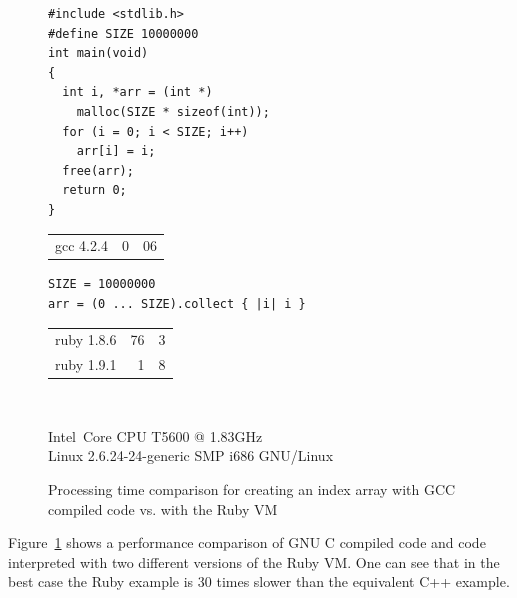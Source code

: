 \documentclass[12pt,a4paper,oneside,openright]{book}
\newcommand{\fig}[1]{Figure~\ref{fig:#1}}
\begin{document}
\begin{CJK}{UTF8}{}
\begin{figure}[htbp]
  \begin{center}
    \lstset{language=C,frame=single,numbers=none}
    \begin{minipage}[c]{.45\textwidth}
      \begin{center}
        \begin{lstlisting}
#include <stdlib.h>
#define SIZE 10000000
int main(void)
{
  int i, *arr = (int *)
    malloc(SIZE * sizeof(int));
  for (i = 0; i < SIZE; i++)
    arr[i] = i;
  free(arr);
  return 0;
}
        \end{lstlisting}
        \begin{bf}
          \begin{tabular}{lr@{.}l@{s}}
            gcc 4.2.4 & 0 & 06
          \end{tabular}
        \end{bf}
      \end{center}
    \end{minipage}\hspace{1ex}
    \lstset{language=Ruby,frame=single,numbers=none}
    \begin{minipage}[c]{.5\textwidth}
      \begin{center}
        \begin{lstlisting}
SIZE = 10000000
arr = (0 ... SIZE).collect { |i| i }
        \end{lstlisting}
        \begin{bf}
          \begin{tabular}{lr@{.}l@{s}}
            ruby 1.8.6 & 76 & 3\\
            ruby 1.9.1 &  1 & 8
          \end{tabular}
        \end{bf}
      \end{center}
    \end{minipage}\medskip\\
    \begin{small}
      Intel\textregistered\ Core \acs{CPU} T5600 @ 1.83GHz\\
      Linux 2.6.24-24-generic SMP i686 \acs{GNU}/Linux
    \end{small}
  \end{center}
  \caption{Processing time comparison for creating an index array with \acs{GCC} compiled code vs. with the Ruby \acs{VM}\label{fig:arraybench}}
\end{figure}
\fig{arraybench} shows a performance comparison of \acs{GNU} C compiled code and code interpreted with two different versions of the Ruby \ac{VM}. One can see that in the best case the Ruby example is 30 times slower than the equivalent C++ example.


\end{CJK}
\end{document}
